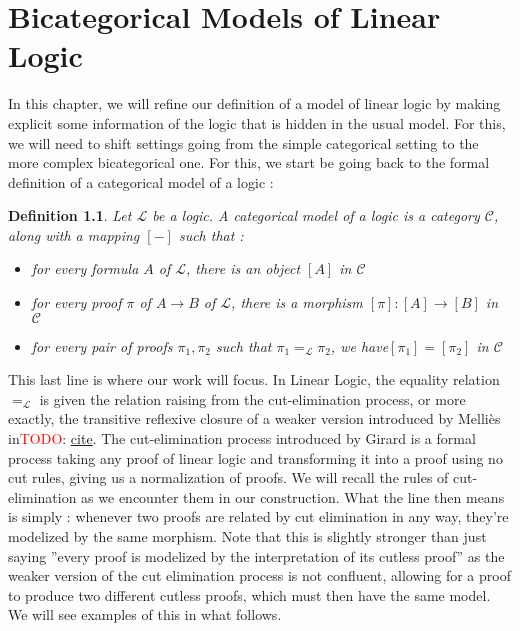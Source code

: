 \documentclass[a4paper, 12pt, twoside,openright]{report}
\newtheorem{definition}{Definition}
\newcommand{\todo}[1]{\textcolor{red}{TODO}: \underline{#1}}
\begin{document}
\chapter{Bicategorical Models of Linear Logic}
In this chapter, we will refine our definition of a model of linear logic by making explicit some information of the logic that is hidden in the usual model. For this, we will need to shift settings going from the simple categorical setting to the more complex bicategorical one. For this, we start be going back to the formal definition of a categorical model of a logic : 


\begin{definition}
Let $\mathcal{L}$ be a logic. A categorical model of a logic is a category $\mathcal{C}$, along with a mapping $[ - ]$ such that : 
\begin{itemize}
\item for every formula $A$ of $\mathcal{L}$, there is an object $[A]$ in $\mathcal{C}$
\item for every proof $\pi$ of $A\rightarrow B$ of $\mathcal{L}$, there is a morphism $[\pi]: [A] \rightarrow [B]$ in $\mathcal{C}$
\item for every pair of proofs $\pi_1, \pi_2$ such that $\pi_1 =_{\mathcal{L}} \pi_2$, we have$[\pi_1]=[\pi_2]$ in  $\mathcal{C}$
\end{itemize}

\end{definition}


This last line is where our work will focus. In Linear Logic, the equality relation $=_{\mathcal{L}}$ is given the relation raising from the cut-elimination process, or more exactly, the transitive reflexive closure of a weaker version introduced by Melliès in\todo{cite}. The cut-elimination process introduced by Girard is a formal process taking any proof of linear logic and transforming it into a proof using no cut rules, giving us a normalization of proofs. We will recall the rules of cut-elimination as we encounter them in our construction. What the line then means is simply : whenever two proofs are related by cut elimination in any way, they're modelized by the same morphism. Note that this is slightly stronger than just saying ''every proof is modelized by the interpretation of its cutless proof'' as the weaker version of the cut elimination process is not confluent, allowing for a proof to produce two different cutless proofs, which must then have the same model. We will see examples of this in what follows. \\
\end{document}
